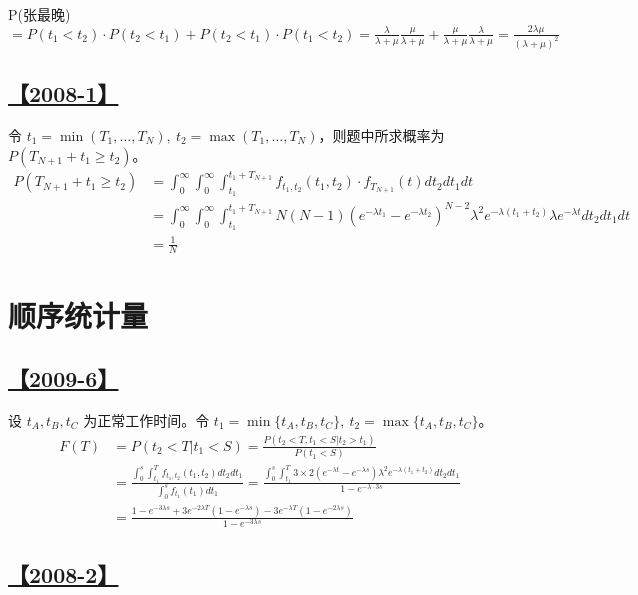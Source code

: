 P(张最晚)$=P(t_1<t_2)\cdot P(t_2<t_1)+P(t_2<t_1)\cdot P(t_1<t_2)=\frac{\lambda}{\lambda+\mu}\frac{\mu}{\lambda+\mu}+\frac{\mu}{\lambda+\mu}\frac{\lambda}{\lambda+\mu}=\frac{2\lambda\mu}{(\lambda+\mu)^2}$

\subsection{\hyperref[Q2008-1]{【2008-1】}}\label{A2008-1}

令 $t_1=\min(T_1,\dots,T_N),\ t_2=\max(T_1,\dots,T_N)$，则题中所求概率为 $P(T_{N+1}+t_1\ge t_2)$。
\begin{equation}\tag*{}
\begin{split}
P(T_{N+1}+t_1\ge t_2)&=\int_0^\infty\int_0^\infty\int_{t_1}^{t_1+T_{N+1}}f_{t_1,t_2}(t_1, t_2)\cdot f_{T_{N+1}}(t)dt_2dt_1dt\\
&=\int_0^{\infty}\int_0^{\infty}\int_{t_1}^{t_1+T_{N+1}}N(N-1)\left(e^{-\lambda t_1}-e^{-\lambda t_2}\right)^{N-2}\lambda^2e^{-\lambda(t_1+t_2)}\lambda e^{-\lambda t}dt_2dt_1dt\\
&=\frac{1}{N}
\end{split}
\end{equation}

\section{顺序统计量}

\subsection{\hyperref[Q2009-6]{【2009-6】}}\label{A2009-6}

设 $t_A, t_B, t_C$ 为正常工作时间。令 $t_1=\min\{t_A, t_B, t_C\},\ t_2=\max\{t_A, t_B, t_C\}$。
\begin{equation}\tag*{}
\begin{split}
F(T)&=P(t_2<T|t_1<S)=\frac{P(t_2<T, t_1<S|t_2>t_1)}{P(t_1<S)}\\
&=\frac{\int_0^s\int_{t_1}^Tf_{t_1, t_2}(t_1, t_2)dt_2dt_1}{\int_0^sf_{t_1}(t_1)dt_1}=\frac{\int_0^s\int_{t_1}^T3\times2(e^{-\lambda t}-e^{-\lambda s})\lambda^2e^{-\lambda(t_1+t_2)}dt_2dt_1}{1-e^{-\lambda\cdot 3s}}\\
&=\frac{1-e^{-3\lambda s}+3e^{-2\lambda T}(1-e^{-\lambda s})-3e^{-\lambda T}(1-e^{-2\lambda s})}{1-e^{-3\lambda s}}
\end{split}
\end{equation}

\subsection{\hyperref[Q2008-2]{【2008-2】}}\label{A2008-2}

